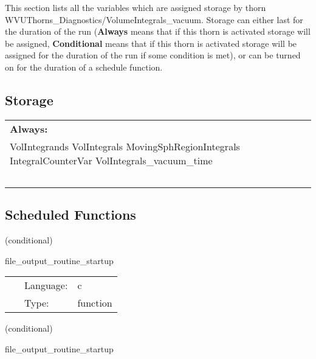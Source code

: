 \noindent This section lists all the variables which are assigned storage by thorn WVUThorns\_Diagnostics/VolumeIntegrals\_vacuum.  Storage can either last for the duration of the run ({\bf Always} means that if this thorn is activated storage will be assigned, {\bf Conditional} means that if this thorn is activated storage will be assigned for the duration of the run if some condition is met), or can be turned on for the duration of a schedule function.


\subsection*{Storage}

\hspace{5mm}

 \begin{tabular*}{160mm}{ll} 

{\bf Always:}&  ~ \\ 
 VolIntegrands VolIntegrals MovingSphRegionIntegrals IntegralCounterVar VolIntegrals\_vacuum\_time & ~\\ 
~ & ~\\ 
\end{tabular*} 


\subsection*{Scheduled Functions}
\vspace{5mm}

   (conditional) 

\hspace{5mm} file\_output\_routine\_startup 

\hspace{5mm}{\it create directory for file output. } 


\hspace{5mm}

 \begin{tabular*}{160mm}{cll} 
~ & Language:  & c \\ 
~ & Type:  & function \\ 
\end{tabular*} 


\vspace{5mm}

   (conditional) 

\hspace{5mm} file\_output\_routine\_startup 

